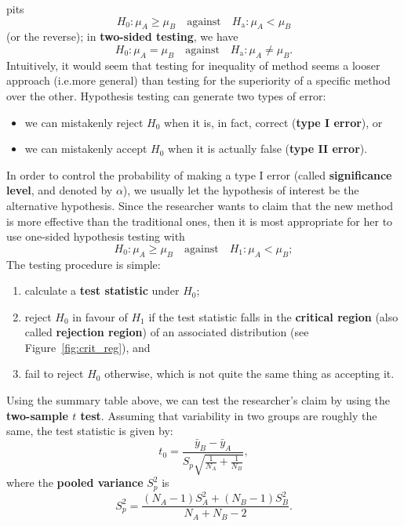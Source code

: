      \afterpage{\FloatBarrier}
pits $$H_{0}: \mu_{A} \geq \mu_{B}\quad\mbox{against}\quad H_{\textrm{a}}: \mu_{A} < \mu_{B}$$ (or the reverse); in \textbf{two-sided testing}, we have $$H_{0}: \mu_{A} = \mu_{B}\quad\mbox{against}\quad H_{\textrm{a}}: \mu_{A} \neq \mu_{B}.$$ Intuitively, it would seem that testing for inequality of method seems a looser approach (i.e.\@ more general) than testing for the superiority of a specific method over the other. 
\newl Hypothesis testing can generate two types of error: 
\begin{itemize}[noitemsep]
\item we can mistakenly reject $H_0$ when it is, in fact, correct (\textbf{type I error}), or 
\item we can mistakenly accept $H_{0}$ when it is actually false (\textbf{type II error}). 
\end{itemize}In order to control the probability of making a type I error (called \textbf{significance level}, and denoted by $\alpha$), we usually let the hypothesis of interest be the alternative hypothesis.
\newl Since the researcher wants to claim that the new method is more effective than the traditional ones, then it is most appropriate for her to use one-sided hypothesis testing with $$H_{0}: \mu_{A} \geq \mu_{B} \quad\mbox{against}\quad H_{1}: \mu_{A} < \mu_{B};$$ The testing procedure is simple:
\begin{enumerate}[noitemsep]
\item calculate a \textbf{test statistic} under $H_0$;
\item reject $H_0$ in favour of $H_1$ if the test statistic falls in the \textbf{critical region} (also called \textbf{rejection region}) of an associated distribution (see Figure~\ref{fig:crit_reg}), and 
\item fail to reject $H_0$ otherwise, which is not quite the same thing as accepting it.
\end{enumerate}
Using the summary table above, we can test the researcher's claim by using the \textbf{two-sample $t$ test}. Assuming that variability in two groups are roughly the same, the test statistic is given by:
\begin{equation*}
    t_{0}=\frac{\bar{y}_{B}-\bar{y}_{A}}{S_{p}\sqrt{\frac{1}{N_{A}}+\frac{1}{N_{B}}}},
\end{equation*}
where the \textbf{pooled variance} $S^{2}_{p}$ is
\begin{equation*}
    S^{2}_{p}=\frac{(N_{A}-1)S^{2}_{A}+(N_{B}-1)S^{2}_{B}}{N_{A}+N_{B}-2}.
\end{equation*}
